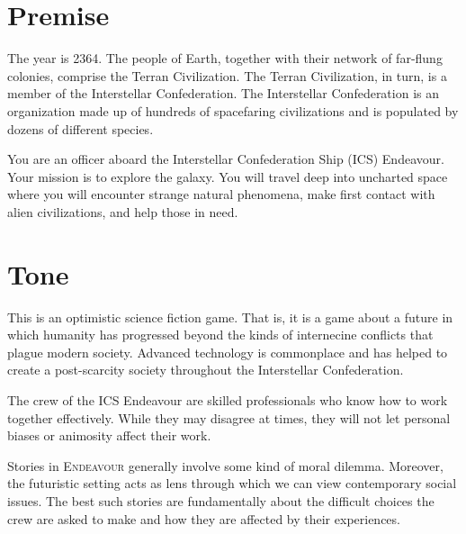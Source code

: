 \documentclass[11pt, a5paper, parskip=half-, DIV=12]{scrartcl}
\newcommand{\ENDEAVOUR}{\textsc{Endeavour}}%
\begin{document}
\setcounter{page}{1}
\setmainfont{TeX Gyre Schola}
\normalsize
\raggedright

\section*{Premise}
The year is 2364. The people of Earth, together with their network of far-flung colonies, comprise the Terran Civilization. The Terran Civilization, in turn, is a member of the Interstellar Confederation. The Interstellar Confederation is an organization made up of hundreds of spacefaring civilizations and is populated by dozens of different species.

You are an officer aboard the Interstellar Confederation Ship (ICS) Endeavour. Your mission is to explore the galaxy. You will travel deep into uncharted space where you will encounter strange natural phenomena, make first contact with alien civilizations, and help those in need.

\section*{Tone}
This is an optimistic science fiction game. That is, it is a game about a future in which humanity has progressed beyond the kinds of internecine conflicts that plague modern society. Advanced technology is commonplace and has helped to create a post-scarcity society throughout the Interstellar Confederation.

The crew of the ICS Endeavour are skilled professionals who know how to work together effectively. While they may disagree at times, they will not let personal biases or animosity affect their work.

Stories in \ENDEAVOUR{} generally involve some kind of moral dilemma. Moreover, the futuristic setting acts as lens through which we can view contemporary social issues. The best such stories are fundamentally about the difficult choices the crew are asked to make and how they are affected by their experiences.  

\newpage
\end{document}
